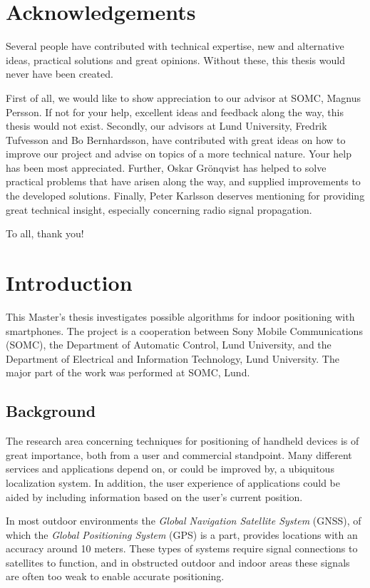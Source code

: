 \documentclass{LTHthesis}
\begin{document}
\chapter*{Acknowledgements}
Several people have contributed with technical expertise, new and alternative ideas, practical solutions and great opinions. Without these, this thesis would never have been created. 

First of all, we would like to show appreciation to our advisor at SOMC, Magnus Persson. If not for your help, excellent ideas and feedback along the way, this thesis would not exist. Secondly, our advisors at Lund University, Fredrik Tufvesson and Bo Bernhardsson, have contributed with great ideas on how to improve our project and advise on topics of a more technical nature. Your help has been most appreciated. Further, Oskar Gr\"{o}nqvist has helped to solve practical problems that have arisen along the way, and supplied improvements to the developed solutions. Finally, Peter Karlsson deserves mentioning for providing great technical insight, especially concerning radio signal propagation.     

To all, thank you!
\tableofcontents
\chapter{Introduction}

This Master's thesis investigates possible algorithms for indoor positioning with smartphones. The project is a cooperation between Sony Mobile Communications (SOMC), the Department of Automatic Control, Lund University, and the Department of Electrical and Information Technology, Lund University. The major part of the work was performed at SOMC, Lund.

\section{Background}
%
The research area concerning techniques for positioning of handheld devices is of great importance, both from a user and commercial standpoint. Many different services and applications depend on, or could be improved by, a ubiquitous localization system. In addition, the user experience of applications could be aided by including information based on the user's current position. %
  
In most outdoor environments the \emph{Global Navigation Satellite System} (GNSS), of which the \emph{Global Positioning System} (GPS) is a part, provides locations with an accuracy around 10 meters. These types of systems require signal connections to satellites to function, and in obstructed outdoor and indoor areas these signals are often too weak to enable accurate positioning. 
\end{document}
